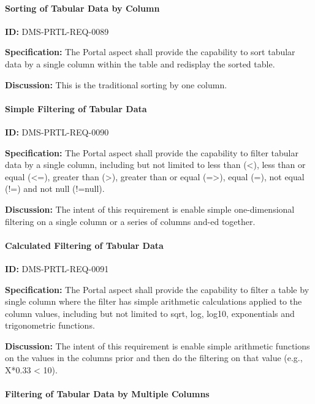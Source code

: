 \documentclass[SE,toc,lsstdraft]{lsstdoc}
\begin{document}
\paragraph{Sorting of Tabular Data by Column}\hfill  %

\label{DMS-PRTL-REQ-0089}
\textbf{ID:} DMS-PRTL-REQ-0089

\textbf{Specification:}
The Portal aspect shall provide the capability to sort tabular data by a single column within the table and redisplay the sorted table.

\textbf{Discussion:}
This is the traditional sorting by one column.

\paragraph{Simple Filtering of Tabular Data}\hfill  %

\label{DMS-PRTL-REQ-0090}
\textbf{ID:} DMS-PRTL-REQ-0090

\textbf{Specification:}
The Portal aspect shall provide the capability to filter tabular data by a single column, including but not limited to less than (<), less than or equal (<=), greater than (>), greater than or equal (=>), equal (=), not equal (!=) and not null (!=null).

\textbf{Discussion:}
The intent of this requirement is enable simple one-dimensional filtering on a single column or a series of columns and-ed together.

\paragraph{Calculated Filtering of Tabular Data}\hfill  %

\label{DMS-PRTL-REQ-0091}
\textbf{ID:} DMS-PRTL-REQ-0091

\textbf{Specification:}
The Portal aspect shall provide the capability to filter a table by single column where the filter has simple arithmetic calculations applied to the column values, including but not limited to sqrt, log, log10, exponentials and trigonometric functions.

\textbf{Discussion:}
The intent of this requirement is enable simple arithmetic functions on the values in the columns prior and then do the filtering on that value (e.g., X*0.33 < 10).

\paragraph{Filtering of Tabular Data by Multiple Columns}\hfill  %
\end{document}
